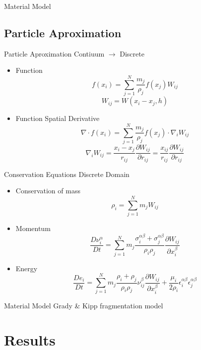 \documentclass[10pt]{beamer}
\begin{document}
\begin{frame}{Material Model}

\end{frame}

\subsection{Particle Aproximation}
\begin{frame}{Particle Aproximation}
Contiuum $\to$ Discrete
\begin{itemize}
\item Function
\[f(x_i)=\sum_{j=1}^{N}{\frac{m_j}{\rho_j}f(x_j)W_{ij}}\]
\[W_{ij}=W(x_i-x_j,h)\]
\item Function Spatial Derivative
\[ \nabla\cdot f(x_i)=\sum_{j=1}^{N}{\frac{m_j}{\rho_j}f(x_j)\cdot\nabla_i W_{ij}}\]
\[\nabla_iW_{ij}=\frac{x_i-x_j}{r_{ij}}\frac{\partial W_{ij} }{\partial r_{ij}}=\frac{x_{ij}}{r_{ij}}\frac{\partial W_{ij}}{\partial r_{ij}}\]
\end{itemize}
\end{frame}

\begin{frame}{Conservation Equations}
Discrete Domain
\begin{itemize}
\item Conservation of mass
\[\rho_i=\sum_{j=1}^{N}{m_jW_{ij}}\]
\item Momentum
\[\frac{D\nu_i^{\alpha}}{Dt}=\sum_{j=1}^{N}{m_j\frac{\sigma_i^{\alpha\beta}+\sigma_j^{\alpha\beta}}{\rho_i\rho_j}\frac{\partial W_{ij}}{\partial x_i^\beta}}\]
\item Energy
\[\frac{De_i}{Dt}=\sum_{j=1}^{N}m_j\frac{\rho_i+\rho_j}{\rho_i\rho_j}\nu_{ij}^\beta\frac{\partial W_{ij}}{\partial x_i^\beta}+\frac{\mu_i}{2\rho_i}\epsilon_i^{\alpha\beta}\epsilon_j^{\alpha\beta}\]
\end{itemize}
\end{frame}

\begin{frame}{Material Model}
Grady \& Kipp fragmentation model

\end{frame}

\section{Results}
\end{document}
